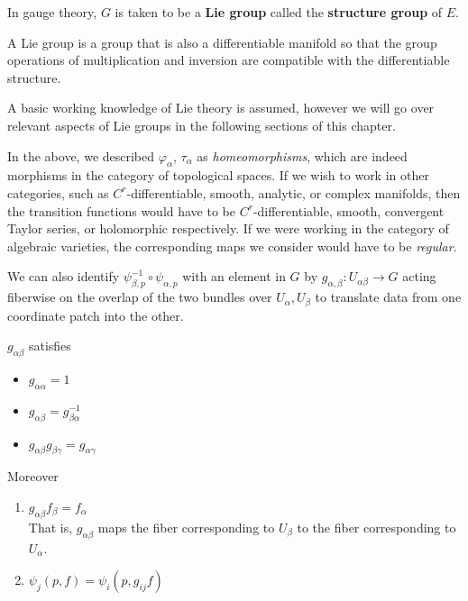 	In gauge theory, $G$ is taken to be a \textbf{Lie group} called the \textbf{structure group} of $E$. 
	\begin{defn}
		A Lie group is a group that is also a differentiable manifold so that the group operations of multiplication and inversion are compatible with the  differentiable structure. 
	\end{defn}
	A basic working knowledge of Lie theory is assumed, however we will go over relevant aspects of Lie groups in the following sections of this chapter.
	
	\begin{nb}
		In the above, we described $\varphi_\alpha$, $\tau_{\alpha}$ as \emph{homeomorphisms}, which are indeed morphisms in the category of topological spaces. If we wish to work in other categories, such as $C^r$-differentiable, smooth, analytic, or complex manifolds, then the transition functions would have to be $C^r$-differentiable, smooth, convergent Taylor series, or holomorphic respectively. 
		If we were working in the category of algebraic varieties, the corresponding maps we consider would have to be \emph{regular}.
	\end{nb}	
		
		We can also identify $\psi^{-1}_{\beta, p} \circ \psi_{\alpha, p}$ with an element in $G$ by $g_{\alpha, \beta}: U_{\alpha \beta} \rightarrow G$ acting fiberwise on the overlap of the two bundles over $U_\alpha, U_\beta$ to translate data from one coordinate patch into the other.
		\begin{prop}
			$g_{\alpha \beta}$ satisfies 
			\begin{itemize}
				\item $g_{\alpha \alpha} = 1$
				\item $g_{\alpha \beta} = g^{-1}_{\beta \alpha}$
				\item $g_{\alpha \beta} g_{\beta \gamma} = g_{\alpha \gamma}$
			\end{itemize}

			Moreover 
			\begin{enumerate}
				\item $g_{\alpha \beta} f_\beta = f_\alpha$\\ That is, $g_{\alpha \beta}$ maps the fiber corresponding to $U_\beta$ to the fiber corresponding to $U_\alpha$.
				\item $\psi_{j} (p, f) = \psi_{i} (p, g_{ij} f)$
			\end{enumerate}
		\end{prop}
		
